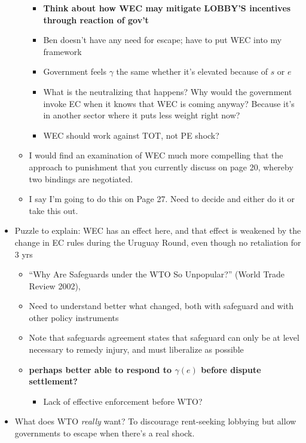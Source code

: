 \documentclass[12pt]{article}
\newcommand{\ga}{\gamma}
\begin{document}
\begin{itemize}
\begin{itemize}
						\begin{itemize}
							\item \textbf{Think about how WEC may mitigate LOBBY'S incentives through reaction of gov't}
							\item Ben doesn't have any need for escape; have to put WEC into my framework
							\item Government feels $\ga$ the same whether it's elevated because of $s$ or $e$
							\item What is the neutralizing that happens? Why would the government invoke EC when it knows that WEC is coming anyway? Because it's in another sector where it puts less weight right now?
							\item WEC should work against TOT, not PE shock?
						\end{itemize}
					\item I would find an examination of WEC much more compelling that the approach to punishment that you currently discuss on page 20, whereby two bindings are negotiated.
					\item I say I'm going to do this on Page 27. Need to decide and either do it or take this out.
				\end{itemize}
			\item Puzzle to explain: WEC has an effect here, and that effect is weakened by the change in EC rules during the Uruguay Round, even though no retaliation for 3 yrs
				\begin{itemize}
					\item ``Why Are Safeguards under the WTO So Unpopular?'' (World Trade Review 2002), %
					\item Need to understand better what changed, both with safeguard and with other policy instruments
					\item Note that safeguards agreement states that safeguard can only be at level necessary to remedy injury, and must liberalize as possible
					\item \textbf{perhaps better able to respond to $\ga(e)$ before dispute settlement?}
						\begin{itemize}
							\item Lack of effective enforcement before WTO?
						\end{itemize}
				\end{itemize}
			\item What does WTO \textit{really} want? To discourage rent-seeking lobbying but allow governments to escape when there's a real shock.

\end{itemize}
\end{document}
